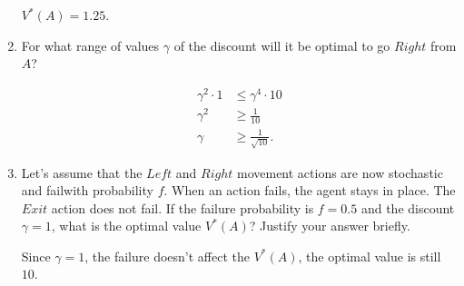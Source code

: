 \documentclass{article}
\begin{document}
\begin{enumerate}[label=(\alph*)]
    $V^*(A) = 1.25$.

    \item For what range of values $\gamma$ of the discount will it be optimal to go $Right$ from $A$?

    \begin{align*}
        \gamma^2 \cdot 1 & \le \gamma^4 \cdot 10 \\
                \gamma^2 & \ge \frac{1}{10} \\
                \gamma   & \ge \frac{1}{\sqrt{10}}.
    \end{align*}

    \item Let's assume that the $Left$ and $Right$ movement actions are now stochastic and failwith probability $f$. When an action fails, the agent stays in place. The $Exit$ action does not fail. If the failure probability is $f = 0.5$ and the discount $\gamma = 1$, what is the optimal value $V^*(A)$? Justify your answer briefly.

    Since $\gamma = 1$, the failure doesn't affect the $V^*(A)$, the optimal value is still $10$.
\end{enumerate}
\end{document}

